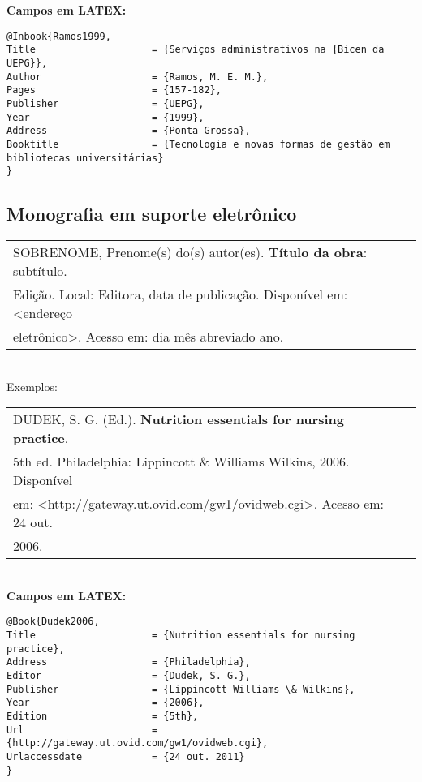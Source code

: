 \textbf{Campos em LATEX:} 
		 
\begingroup
\fontsize{10pt}{12pt}\selectfont
\begin{verbatim}
@Inbook{Ramos1999,
Title                    = {Serviços administrativos na {Bicen da UEPG}},
Author                   = {Ramos, M. E. M.},
Pages                    = {157-182},
Publisher                = {UEPG},
Year                     = {1999},
Address                  = {Ponta Grossa},
Booktitle                = {Tecnologia e novas formas de gestão em 
bibliotecas universitárias}
}
\end{verbatim}
\endgroup
	
\subsection{Monografia em suporte eletrônico}	 
		 
\begin{tabular}{|l|c|} \hline
	SOBRENOME, Prenome(s) do(s) autor(es). \textbf{Título da obra}: 
	subtítulo.                                                      \\ Edição. Local: Editora, data de publicação. Disponível em: <endereço \\eletrônico>. Acesso em: dia mês abreviado ano.     \\\hline
\end{tabular} \\
		 
Exemplos: \\ 
		 
\begin{tabular}{|l|c|} \hline
	DUDEK, S. G. (Ed.). \textbf{Nutrition essentials for nursing practice}. \\5th ed. Philadelphia: Lippincott \& Williams  Wilkins, 2006. Disponível \\ em: <http://gateway.ut.ovid.com/gw1/ovidweb.cgi>. Acesso em: 24 out. \\2006.  \\\hline
\end{tabular} \\ 
		 
\textbf{Campos em LATEX:} 
		 
\begingroup
\fontsize{10pt}{12pt}\selectfont
\begin{verbatim}
@Book{Dudek2006,
Title                    = {Nutrition essentials for nursing practice},
Address                  = {Philadelphia},
Editor                   = {Dudek, S. G.},
Publisher                = {Lippincott Williams \& Wilkins},
Year                     = {2006},
Edition                  = {5th},
Url                      = {http://gateway.ut.ovid.com/gw1/ovidweb.cgi},
Urlaccessdate            = {24 out. 2011}
}
\end{verbatim}
\endgroup
		 
